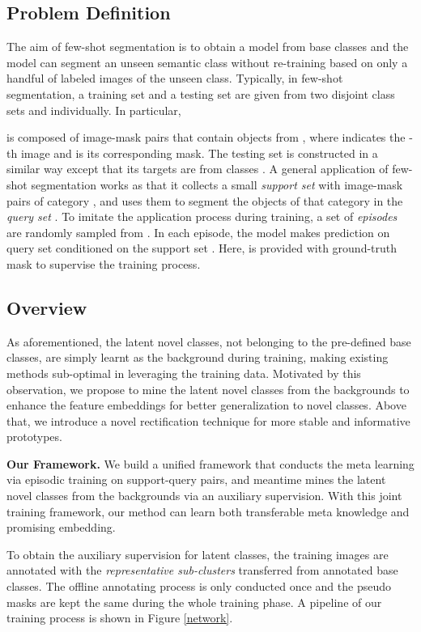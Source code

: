 \documentclass[10pt,twocolumn,letterpaper]{article}
\begin{document}
\subsection{Problem Definition}

The aim of few-shot segmentation is to obtain a model from base classes and the model can segment an unseen semantic class without re-training based on only a handful of labeled images of the unseen class.  Typically, in few-shot segmentation, a training set  and a testing set  are given from two disjoint class sets  and  individually. In particular, 

is composed of  image-mask pairs that contain objects from , where  indicates the -th image and  is its corresponding mask. The testing set  is constructed in a similar way except that its targets are from classes .
A general application of few-shot segmentation works as that it collects a small \textit{support set}  with  image-mask pairs of category , and uses them to segment the objects of that category in the \textit{query set} . To imitate the application process during training, a set of \textit{episodes}  are randomly sampled from . In each episode, the model makes prediction on query set  conditioned on the support set . Here,  is provided with ground-truth mask to supervise the training process. 

\subsection{Overview}
As aforementioned, the latent novel classes, not belonging to the pre-defined base classes, are simply learnt as the background during training, making existing methods sub-optimal in leveraging the training data. Motivated by this observation, we propose to mine the latent novel classes from the backgrounds to enhance the feature embeddings for better generalization to novel classes. Above that, we introduce a novel rectification technique for more stable and informative prototypes. 


\textbf{Our Framework.}
We build a unified framework that conducts the meta learning via episodic training on support-query pairs, and meantime mines the latent novel classes from the backgrounds via an auxiliary supervision. With this joint training framework, our method can learn both transferable meta knowledge and promising embedding.

To obtain the auxiliary supervision for latent classes, the training images are annotated with the \textit{representative sub-clusters} transferred from annotated base classes. The offline annotating process is only conducted once and the pseudo masks are kept the same during the whole training phase. A pipeline of our training process is shown in Figure \ref{network}. 
\end{document}
